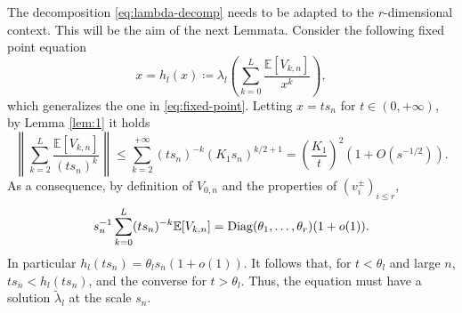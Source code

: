 \documentclass[11pt,oneside]{amsart}
\theoremstyle{plain}
\numberwithin{equation}{section}
\newcommand{\E}{\mathbb{E}}
\newcommand{\scaling}{s_n}
\begin{document}
The decomposition \eqref{eq:lambda-decomp} needs to be adapted to the $r$-dimensional context. This will be the aim of the next Lemmata.
Consider the following fixed point equation
\begin{equation}
    x=h_l(x)\coloneqq \lambda_l\left(\sum_{k=0}^L \frac{\E[V_{k,n}]}{x^k}\right),
\end{equation}
which generalizes the one in \eqref{eq:fixed-point}.
Letting $x= t \scaling$ for $t \in (0,+\infty)$, by Lemma \ref{lem:1} it holds 
\begin{equation}
    \left\|\sum_{k=2}^L \frac{\E[V_{k,n}]}{(t \scaling)^k }\right\|\le \sum_{k=2}^{+\infty} (t \scaling)^{-k} (K_1 \scaling)^{k/2+1}=\left(\frac{K_1}{t}\right)^2(1+O(s^{-1/2})).
\end{equation}
As a consequence, by definition of $V_{0,n}$ and the properties of $(v_i^\pm)_{i \le r}$, $$\scaling^{-1} \sum_{k=0}^{L} (t \scaling)^{-k} \E[V_{k,n}]= {\rm Diag}(\theta_1,\dots,\theta_r)(1+o(1)).$$
In particular $h_l(t \scaling)=\theta_l\scaling(1+o(1))$. It follows that, for $t< \theta_l$ and large $n$, $t \scaling < h_l(t\scaling)$, and the converse for $t >\theta_l$. Thus, the equation must have a solution $\tilde \lambda_l$ at the scale $\scaling$.
\end{document}
